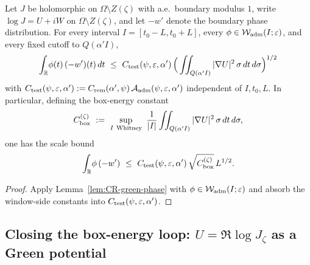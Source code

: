 \begin{proposition}\label{prop:length-free}
Let \(J\) be holomorphic on \(\Omega\setminus Z(\zeta)\) with a.e.\ boundary modulus \(1\), write \(\log J=U+iW\) on \(\Omega\setminus Z(\zeta)\), and let \(-w'\) denote the boundary phase distribution.
For every interval \(I=[t_0-L,t_0+L]\), every \(\phi\in\mathcal W_{\rm adm}(I;\varepsilon)\), and every fixed cutoff to \(Q(\alpha' I)\),
\begin{equation}\label{eq:CRG-upper-adm}
\int_{\mathbb R}\!\phi(t)\,(-w')(t)\,dt\ \le\ C_{\rm test}(\psi,\varepsilon,\alpha')\,\Big(\iint_{Q(\alpha' I)}|\nabla U|^2\,\sigma\,dt\,d\sigma\Big)^{1/2}
\end{equation}
with \(C_{\rm test}(\psi,\varepsilon,\alpha'):=C_{\rm rem}(\alpha',\psi)\,\mathcal A_{\rm adm}(\psi,\varepsilon,\alpha')\) independent of \(I,t_0,L\).
In particular, defining the box-energy constant
\[
  C_{\rm box}^{(\zeta)}\ :=\ \sup_{I\ \mathrm{Whitney}}\ \frac{1}{|I|}\iint_{Q(\alpha' I)}|\nabla U|^2\,\sigma\,dt\,d\sigma,
\]
one has the scale bound
\[
  \int_{\mathbb R}\!\phi\,(-w')\ \le\ C_{\rm test}(\psi,\varepsilon,\alpha')\,\sqrt{C_{\rm box}^{(\zeta)}}\,L^{1/2}.
\]
\end{proposition}
\begin{proof}
Apply Lemma~\ref{lem:CR-green-phase} with \(\phi\in\mathcal W_{\rm adm}(I;\varepsilon)\) and absorb the window-side constants into \(C_{\rm test}(\psi,\varepsilon,\alpha')\).
\end{proof}

\subsection*{Closing the box-energy loop: \(U=\Re\log J_\zeta\) as a Green potential}

